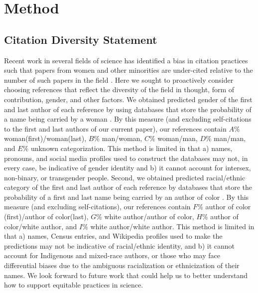 \documentclass[12pt]{article}
\begin{document}
\section{Method}
\subsection{Citation Diversity Statement}

Recent work in several fields of science has identified a bias in citation practices such that papers from women and other minorities are under-cited relative to the number of such papers in the field \cite{mitchell2013gendered,dion2018gendered,caplar2017quantitative, maliniak2013gender, Dworkin2020.01.03.894378, bertolero2021racial, wang2021gendered, chatterjee2021gender, fulvio2021imbalance}. Here we sought to proactively consider choosing references that reflect the diversity of the field in thought, form of contribution, gender, and other factors. We obtained predicted gender of the first and last author of each reference by using databases that store the probability of a name being carried by a woman \cite{Dworkin2020.01.03.894378,zhou_dale_2020_3672110}. By this measure (and excluding self-citations to the first and last authors of our current paper), our references contain $A\%$ woman(first)/woman(last), $B\%$ man/woman, $C\%$ woman/man, $D\%$ man/man, and $E\%$ unknown categorization. This method is limited in that a) names, pronouns, and social media profiles used to construct the databases may not, in every case, be indicative of gender identity and b) it cannot account for intersex, non-binary, or transgender people. Second, we obtained predicted racial/ethnic category of the first and last author of each reference by databases that store the probability of a first and last name being carried by an author of color \cite{ambekar2009name, sood2018predicting}. By this measure (and excluding self-citations), our references contain $F\%$ author of color (first)/author of color(last), $G\%$ white author/author of color, $H\%$ author of color/white author, and $I\%$ white author/white author. This method is limited in that a) names, Census entries, and Wikipedia profiles used to make the predictions may not be indicative of racial/ethnic identity, and b) it cannot account for Indigenous and mixed-race authors, or those who may face differential biases due to the ambiguous racialization or ethnicization of their names. We look forward to future work that could help us to better understand how to support equitable practices in science.

\newpage


\end{document}
